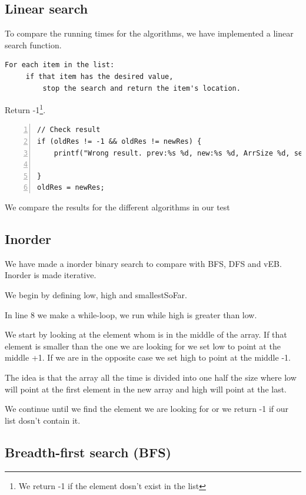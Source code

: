 \subsection{Linear search}
To compare the running times for the algorithms, we have implemented a linear search function.
\begin{verbatim}
For each item in the list:
     if that item has the desired value,
         stop the search and return the item's location.
\end{verbatim}
 Return -1\footnote{We return -1 if the element dosn't exist in the list}.
 \begin{lstlisting}[numbers=left]
 // Check result
if (oldRes != -1 && oldRes != newRes) {
	printf("Wrong result. prev:%s %d, new:%s %d, ArrSize %d, searchFor %d\n", algo_labels[iAlg-1], oldRes, algo_labels[iAlg], newRes, arrSize, searchFor); 
 					
}
oldRes = newRes;
\end{lstlisting}
We compare the results for the different algorithms in our test

\subsection{Inorder}

We have made a inorder binary search to compare with BFS, DFS and vEB.
Inorder is made iterative.

We begin by defining low, high and smallestSoFar.

In line 8 we make a while-loop, we run while high is greater than low.

We start by looking at the element whom is in the middle of the array.
If that element is smaller than the one we are looking for we set low to point at the middle +1.
If we are in the opposite case we set high to point at the middle -1.

The idea is that the array all the time is divided into one half the size where low will point at the first element in the new array and high will point at the last.

We continue until we find the element we are looking for or we return -1 if our list dosn't contain it.

\subsection{Breadth-first search (BFS)}


